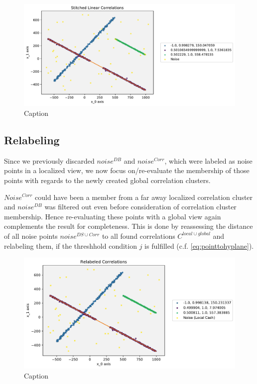 \begin{figure}
    \centering
    \includegraphics[width=.6\textwidth]{figures_method/StitchedLinearCorrelationsWithCorrs.pdf}
    \caption{Caption}
    \label{fig:my_label}
\end{figure}

\subsection{Relabeling}

Since we previously discarded $noise^{DB}$ and $noise^{Corr}$, which were labeled as noise points in a localized view, we now focus on/re-evaluate the membership of those points with regards to the newly created global correlation clusters. 

$Noise^{Corr}$ could have been a member from a far away localized correlation cluster and $noise^{DB}$ was filtered out even before consideration of correlation cluster membership. Hence re-evaluating these points with a global view again complements the result for completeness. This is done by reassessing the distance of all noise points $noise^{DS \cup Corr}$ to all found correlations $C^{local \cup global}$ and relabeling them, if the threshhold condition $j$ is fulfilled (c.f. \autoref{eq:pointtohyplane}).\\
\begin{figure}
    \centering
    \includegraphics[width=.6\textwidth]{figures_method/RelabeledCorrelationsWithCorrsL.pdf}
    \caption{Caption}
    \label{fig:my_label}
\end{figure}


